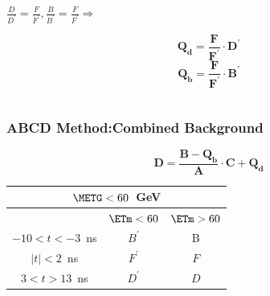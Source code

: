\documentclass{beamer}
\begin{document}
\begin{frame}
\begin{minipage}[b]{0.8\paperwidth}
\begin{columns}
\begin{column}{0.45\linewidth}
        $\frac{D}{D^{\prime}} = \frac{F}{F^{\prime}}, \frac{B}{B^{\prime}} = \frac{F}{F^{\prime}} \Rightarrow$
      \begin{tcolorbox}[colback=blue!5,colframe=UMN@Gold!40]
        \begin{equation*}
          \mathbf{Q_{d} = \frac{F}{F^{\prime}}\cdot D^{\prime} }
         \end{equation*}
         \begin{equation*}
           \mathbf{Q_{b} = \frac{F}{F^{\prime}}\cdot B^{\prime} }
         \end{equation*}
     \end{tcolorbox}   
  \end{column}
 \end{columns}
 \end{minipage}
\end{frame}

\begin{frame}
\frametitle{ABCD Method:Combined Background}
 \begin{minipage}[t]{0.8\paperwidth}
    \begin{tcolorbox}[colback=blue!5,colframe=UMN@Gold!40,title=\textcolor{UMN@Maroon}{\textbf{Combined Background Estimation.}}]
         \begin{equation*}
           \mathbf{D = \frac{B- Q_{b} }{A}\cdot C + Q_{d} }
         \end{equation*}
     \end{tcolorbox}
 \end{minipage}
 
 \begin{minipage}[b]{0.8\paperwidth}
  \begin{tcolorbox}[colback=UNL@Cream!5,colframe=UMN@Maroon!40,title=\textcolor{UMN@Maroon}{\textbf{Closure Test: $< 2$-Jets Events}}]
      \begin{tabular}{|c || c|| c|}
        \multicolumn{3}{c}{\bfseries{$\METG < 60$~GeV}} \\
        \hline \hline
          & $ \ETm < 60$ & $ \ETm > 60$ \\       
          \hline \hline \hline
          $-10 < t < -3$~ns & $B^{\prime}$ &  B \\
          \hline \hline \hline    
          $ |t| < 2$~ns & $F^{\prime}$ &  $F$ \\
          \hline \hline \hline
          $ 3 < t > 13$~ns & $D^{\prime}$ &  $D$ \\
        \hline \hline \hline
       \end{tabular}
     \end{tcolorbox}       
  \end{minipage}
\end{frame}   
   
\end{document}
